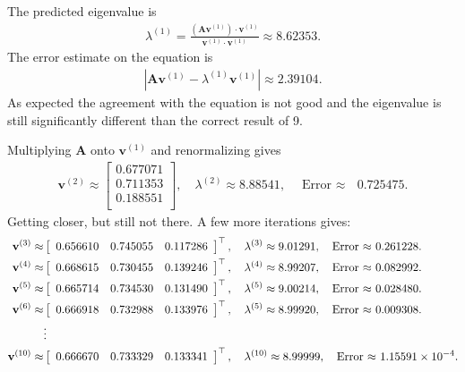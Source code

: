 The predicted eigenvalue is
\begin{align}
  \lambda^{(1)} = \frac{ ( \mathbf{A} \mathbf{v}^{(1)} ) \cdot \mathbf{v}^{(1)} }{ \mathbf{v}^{(1)} \cdot  \mathbf{v}^{(1)} } \approx 8.62353 . \nonumber
\end{align}
The error estimate on the equation is
\begin{align}
  | \mathbf{A} \mathbf{v}^{(1)} -  \lambda^{(1)} \mathbf{v}^{(1)} | \approx 2.39104. \nonumber
\end{align}
As expected the agreement with the equation is not good and the eigenvalue is still significantly different than the correct result of 9.

Multiplying $\mathbf{A}$ onto $\mathbf{v}^{(1)}$ and renormalizing gives
\begin{align}
  \mathbf{v}^{(2)} \approx
   \left[ \begin{array}{c} 0.677071  \\ 0.711353  \\ 0.188551 \\ \end{array} \right] , \quad \lambda^{(2)} \approx 8.88541 , \quad \text{Error $\approx$ } 0.725475 . \nonumber
\end{align}
Getting closer, but still not there. A few more iterations gives:
\begin{align}
  \mathbf{v}^{(3)} \approx
   &\left[ \begin{array}{c c c} 0.656610 & 0.745055 & 0.117286 \end{array} \right]^\top , \quad \lambda^{(3)} \approx 9.01291 , \quad \text{Error $\approx$ } 0.261228 . \nonumber \\
   \mathbf{v}^{(4)} \approx
   &\left[ \begin{array}{c c c} 0.668615 & 0.730455 & 0.139246 \end{array} \right]^\top , \quad \lambda^{(4)} \approx 8.99207 , \quad \text{Error $\approx$ } 0.082992 . \nonumber \\
   \mathbf{v}^{(5)} \approx
   &\left[ \begin{array}{c c c} 0.665714 & 0.734530 & 0.131490 \end{array} \right]^\top , \quad \lambda^{(5)} \approx 9.00214 , \quad \text{Error $\approx$ } 0.028480 . \nonumber \\
   \mathbf{v}^{(6)} \approx
   &\left[ \begin{array}{c c c} 0.666918 & 0.732988 & 0.133976 \end{array} \right]^\top , \quad \lambda^{(5)} \approx 8.99920 , \quad \text{Error $\approx$ } 0.009308 . 
\nonumber \\
   &\vdots \nonumber \\
    \mathbf{v}^{(10)} \approx
   &\left[ \begin{array}{c c c} 0.666670 & 0.733329 & 0.133341 \end{array} \right]^\top , \quad \lambda^{(10)} \approx 8.99999 , \quad \text{Error $\approx$ } 1.15591 \times 10^{-4} . \nonumber 
\end{align}
